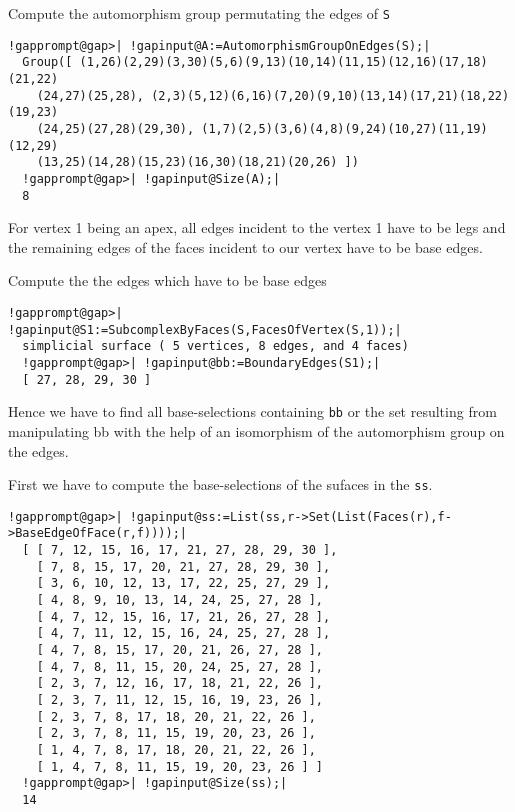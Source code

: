 \documentclass[a4paper,11pt]{report}
\begin{document}
{{ Compute the automorphism group permutating the edges of \texttt{S} 

 
\begin{Verbatim}[commandchars=!@|,fontsize=\small,frame=single,label=Example]
  !gapprompt@gap>| !gapinput@A:=AutomorphismGroupOnEdges(S);|
  Group([ (1,26)(2,29)(3,30)(5,6)(9,13)(10,14)(11,15)(12,16)(17,18)(21,22)
    (24,27)(25,28), (2,3)(5,12)(6,16)(7,20)(9,10)(13,14)(17,21)(18,22)(19,23)
    (24,25)(27,28)(29,30), (1,7)(2,5)(3,6)(4,8)(9,24)(10,27)(11,19)(12,29)
    (13,25)(14,28)(15,23)(16,30)(18,21)(20,26) ])
  !gapprompt@gap>| !gapinput@Size(A);|
  8
\end{Verbatim}
 

 For vertex 1 being an apex, all edges incident to the vertex 1 have to be legs
and the remaining edges of the faces incident to our vertex have to be base
edges. 

 Compute the the edges which have to be base edges 

 
\begin{Verbatim}[commandchars=!@|,fontsize=\small,frame=single,label=Example]
  !gapprompt@gap>| !gapinput@S1:=SubcomplexByFaces(S,FacesOfVertex(S,1));|
  simplicial surface ( 5 vertices, 8 edges, and 4 faces)
  !gapprompt@gap>| !gapinput@bb:=BoundaryEdges(S1);|
  [ 27, 28, 29, 30 ]
\end{Verbatim}
 

 
\begin{center}

\end{center}
 

 Hence we have to find all base-selections containing \texttt{bb} or the set resulting from manipulating bb with the help of an isomorphism of
the automorphism group on the edges. 

 First we have to compute the base-selections of the sufaces in the \texttt{ss}. 
\begin{Verbatim}[commandchars=!@|,fontsize=\small,frame=single,label=Example]
  !gapprompt@gap>| !gapinput@ss:=List(ss,r->Set(List(Faces(r),f->BaseEdgeOfFace(r,f))));|
  [ [ 7, 12, 15, 16, 17, 21, 27, 28, 29, 30 ], 
    [ 7, 8, 15, 17, 20, 21, 27, 28, 29, 30 ], 
    [ 3, 6, 10, 12, 13, 17, 22, 25, 27, 29 ], 
    [ 4, 8, 9, 10, 13, 14, 24, 25, 27, 28 ], 
    [ 4, 7, 12, 15, 16, 17, 21, 26, 27, 28 ], 
    [ 4, 7, 11, 12, 15, 16, 24, 25, 27, 28 ], 
    [ 4, 7, 8, 15, 17, 20, 21, 26, 27, 28 ], 
    [ 4, 7, 8, 11, 15, 20, 24, 25, 27, 28 ], 
    [ 2, 3, 7, 12, 16, 17, 18, 21, 22, 26 ], 
    [ 2, 3, 7, 11, 12, 15, 16, 19, 23, 26 ], 
    [ 2, 3, 7, 8, 17, 18, 20, 21, 22, 26 ], 
    [ 2, 3, 7, 8, 11, 15, 19, 20, 23, 26 ], 
    [ 1, 4, 7, 8, 17, 18, 20, 21, 22, 26 ], 
    [ 1, 4, 7, 8, 11, 15, 19, 20, 23, 26 ] ]
  !gapprompt@gap>| !gapinput@Size(ss);|
  14
\end{Verbatim}
 

}}
\end{document}
